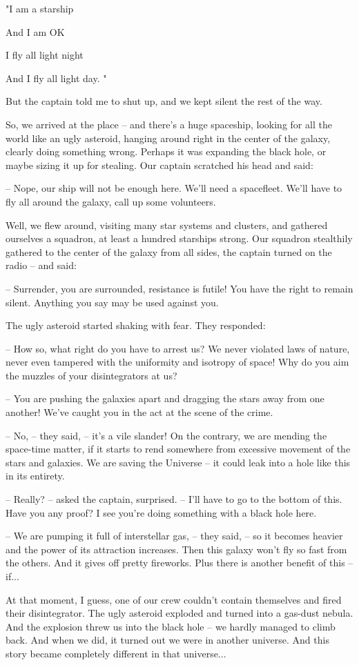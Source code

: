 \documentclass[ebook,twoside,final,openright]{memoir}
\begin{document}
"I am a starship \par
 And I am OK \par
 I fly all light night \par
 And I fly all light day. "\par
 But the captain told me to shut up, and we kept silent the rest of the way.\par
\par
So, we arrived at the place – and there’s a huge spaceship, looking for all the world like an ugly asteroid, hanging around right in the center of the galaxy, clearly doing something wrong. Perhaps it was expanding the black hole, or maybe sizing it up for stealing. Our captain scratched his head and said:\par
– Nope, our ship will not be enough here. We’ll need a spacefleet. We'll have to fly all around the galaxy, call up some volunteers.\par
Well, we flew around, visiting many star systems and clusters, and gathered ourselves a squadron, at least a hundred starships strong. Our squadron stealthily gathered to the center of the galaxy from all sides, the captain turned on the radio – and said:\par
– Surrender, you are surrounded, resistance is futile! You have the right to remain silent. Anything you say may be used against you.\par
The ugly asteroid started shaking with fear. They responded:\par
– How so, what right do you have to arrest us? We never violated laws of nature, never even tampered with the uniformity and isotropy of space! Why do you aim the muzzles of your disintegrators at us?\par
– You are pushing the galaxies apart and dragging the stars away from one another! We’ve caught you in the act at the scene of the crime.\par
– No, – they said, – it’s a vile slander! On the contrary, we are mending the space-time matter, if it starts to rend somewhere from excessive movement of the stars and galaxies. We are saving the Universe – it could leak into a hole like this in its entirety.\par
– Really? – asked the captain, surprised. – I’ll have to go to the bottom of this. Have you any proof? I see you're doing something with a black hole here.\par
– We are pumping it full of interstellar gas, – they said, – so it becomes heavier and the power of its attraction increases. Then this galaxy won’t fly so fast from the others. And it gives off pretty fireworks. Plus there is another benefit of this – if...\par
At that moment, I guess, one of our crew couldn’t contain themselves and fired their disintegrator. The ugly asteroid exploded and turned into a gas-dust nebula. And the explosion threw us into the black hole – we hardly managed to climb back. And when we did, it turned out we were in another universe. And this story became completely different in that universe...
\end{document}
